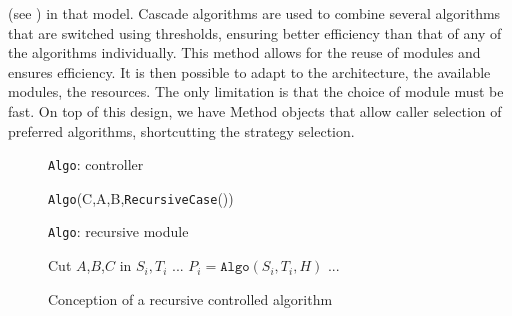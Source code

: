\documentclass[a4paper]{article}
\def\ldots{...}
\begin{document}
(see \cite{Dumas:2008:Flas}) in that model. Cascade algorithms are used to combine
several algorithms that are switched using thresholds, ensuring better
efficiency than that of any of the algorithms individually.
%
%
%
This method allows for the reuse of modules and ensures efficiency.
It is then possible to adapt to the architecture, the available modules,
the resources. The only limitation is that the choice of module
must be fast.
%
%
On top of this design, we have Method objects that allow caller selection
of preferred algorithms, shortcutting the strategy selection.
%
% 
%
\begin{figure}[h]
	\small
        \hfil
	\begin{minipage}[t]{0.45\textwidth}
                \begin{algorithm}[H]
                        \caption{\texttt{Algo}: controller}
                        \label{alg:controle}
			{
				{\tt Algo}(C,A,B,{\tt RecursiveCase}())
			}
                \end{algorithm}
        \end{minipage}
        \hfil
	\begin{minipage}[t]{0.49\textwidth}
                \begin{algorithm}[H]
                        \DontPrintSemicolon
                        \caption{\texttt{Algo}: recursive module}
                        \label{alg:action}
                        Cut $A$,$B$,$C$ in $S_i, T_i$\;
                        \ldots \;
                        $P_i = \mathtt{Algo}(S_i,T_i,H)$ \;
                        \ldots \;
                \end{algorithm}
        \end{minipage}
        \hfil
        \caption{Conception of a recursive controlled algorithm}
        \label{fig:seuil}
\end{figure}
\end{document}
